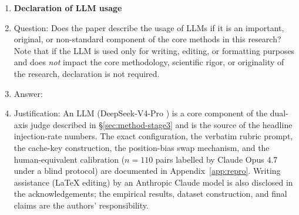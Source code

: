 \begin{enumerate}
\item {\bf Declaration of LLM usage}
    \item[] Question: Does the paper describe the usage of LLMs if it is an important, original, or non-standard component of the core methods in this research? Note that if the LLM is used only for writing, editing, or formatting purposes and does \emph{not} impact the core methodology, scientific rigor, or originality of the research, declaration is not required.
    \item[] Answer: \answerYes{}
    \item[] Justification: An LLM (DeepSeek-V4-Pro \citep{deepseekv3}) is a core component of the dual-axis judge described in \S\ref{sec:method-stage3} and is the source of the headline injection-rate numbers. The exact configuration, the verbatim rubric prompt, the cache-key construction, the position-bias swap mechanism, and the human-equivalent calibration ($n=110$ pairs labelled by Claude Opus 4.7 under a blind protocol) are documented in Appendix~\ref{app:repro}. Writing assistance (LaTeX editing) by an Anthropic Claude model is also disclosed in the acknowledgements; the empirical results, dataset construction, and final claims are the authors' responsibility.

\end{enumerate}
